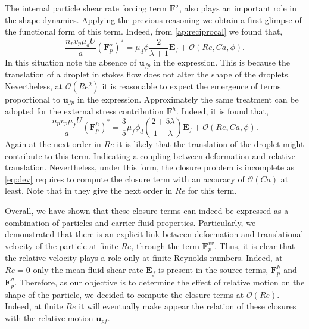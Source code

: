 The internal particle shear rate forcing term $\textbf{F}^\sigma$, also plays an important role in the shape dynamics. 
Applying the previous reasoning we obtain a first glimpse of the functional form of this term. 
Indeed, from \ref{ap:reciprocal} we found that, 
\begin{equation*}
    \frac{n_p v_p  \mu_d U}{a}(\textbf{F}_p^{\sigma})^*
    = \mu_d \phi \frac{ 2 }{\lambda+1}
    \textbf{E}_f
    + \mathcal{O}(Re,Ca,\phi). 
\end{equation*}
In this situation note the absence of $\textbf{u}_{fp}$ in the expression.
This is because the translation of a droplet in stokes flow does not alter the shape of the droplets. 
Nevertheless, at $\mathcal{O}(Re^2)$ it is reasonable to expect the emergence of terms proportional to $\textbf{u}_{fp}$ in the expression.
Approximately the same treatment can be adopted for the external stress contribution $\textbf{F}^h$. 
Indeed, it is found that, 
\begin{equation}
    \frac{n_p v_p \mu_f U}{a}
    (\textbf{F}^h_p)^*
    = 
    \frac{3}{5}\mu_f \phi_d \left(\frac{2+5\lambda}{1+\lambda}\right)
    \textbf{E}_f
    + \mathcal{O}(Re,Ca,\phi).
    \label{eq:closure_stress}
\end{equation}
Again at the next order in $Re$ it is likely that the translation of the droplet might contribute to this term. 
Indicating a coupling between deformation and relative translation. 
Nevertheless, under this form, the closure problem is incomplete as \ref{eq:dev} requires to compute the closure term with an accuracy of $\mathcal{O}(Ca)$ at least. 
Note that in \citet{raja2010inertial} they give the next order in $Re$ for this term.


Overall, we have shown that these closure terms can indeed be expressed as a combination of particles and carrier fluid properties.
Particularly, we demonstrated that there is an explicit link between deformation and translational velocity of the particle at finite $Re$, through the term $\textbf{F}^{vv}_p$. 
Thus, it is clear that the relative velocity plays a role only at finite Reynolds numbers. 
Indeed, at $Re = 0$ only the mean fluid shear rate $\textbf{E}_f$ is present in the source terms, $\textbf{F}^h_p$ and $\textbf{F}_p^{\sigma}$. 
Therefore, as our objective is to determine the effect of relative motion on the shape of the particle, we decided to compute the closure terms at $\mathcal{O}(Re)$. 
Indeed, at finite $Re$ it will eventually make appear the relation of these closures with the relative motion $\textbf{u}_{pf}$. 


